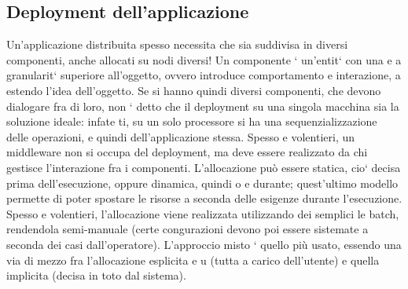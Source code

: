 \documentclass[a4paper,12pt]{article}
\begin{document}
\subsection{Deployment dell'applicazione}

Un'applicazione distribuita spesso necessita che sia suddivisa in diversi componenti, anche allocati su nodi diversi! Un
componente ` un'entit` con una
e
a
granularit` superiore all'oggetto, ovvero introduce comportamento e interazione,
a
estendo l'idea dell'oggetto.
Se si hanno quindi diversi componenti, che devono dialogare fra di loro, non
` detto che il deployment su una singola macchina sia la soluzione ideale: infate
ti, su un solo processore si ha una sequenzializzazione delle operazioni, e quindi
dell'applicazione stessa.
Spesso e volentieri, un middleware non si occupa del deployment, ma deve
essere realizzato da chi gestisce l'interazione fra i componenti. L'allocazione
può essere statica, cio` decisa prima dell'esecuzione, oppure dinamica, quindi
o
e
durante; quest'ultimo modello permette di poter spostare le risorse a seconda
delle esigenze durante l'esecuzione. Spesso e volentieri, l'allocazione viene realizzata utilizzando dei semplici le
batch, rendendola semi-manuale (certe congurazioni devono poi essere sistemate a seconda dei casi dall'operatore).
L'approccio misto ` quello più usato, essendo una via di mezzo fra l'allocazione esplicita
e
u
(tutta a carico dell'utente) e quella implicita (decisa in toto dal sistema).
\end{document}
